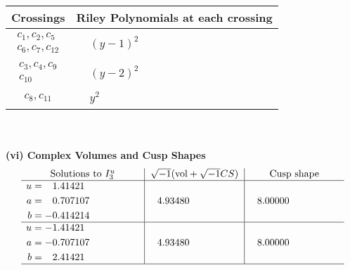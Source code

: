 \documentclass[1p]{elsarticle_modified}
\theoremstyle{definition}
\newcommand{\I}{\sqrt{-1}}
\begin{document}
\begin{tabular}{m{50pt}|m{274pt}}
Crossings & \hspace{64pt}Riley Polynomials at each crossing \\
\hline $$\begin{aligned}c_{1},c_{2},c_{5}\\c_{6},c_{7},c_{12}\end{aligned}$$&$\begin{aligned}
&(y-1)^2
\end{aligned}$\\
\hline $$\begin{aligned}c_{3},c_{4},c_{9}\\c_{10}\end{aligned}$$&$\begin{aligned}
&(y-2)^2
\end{aligned}$\\
\hline $$\begin{aligned}c_{8},c_{11}\end{aligned}$$&$\begin{aligned}
&y^2
\end{aligned}$\\
\hline
\end{tabular}\\~\\
\newpage\flushleft \textbf{(vi) Complex Volumes and Cusp Shapes}
$$\begin{array}{c|c|c}  
\text{Solutions to }I^u_{3}& \I (\text{vol} + \sqrt{-1}CS) & \text{Cusp shape}\\
 \hline 
\begin{aligned}
u &= \phantom{-}1.41421\phantom{ +0.000000I} \\
a &= \phantom{-}0.707107\phantom{ +0.000000I} \\
b &= -0.414214\phantom{ +0.000000I}\end{aligned}
 & \phantom{-}4.93480\phantom{ +0.000000I} & \phantom{-}8.00000\phantom{ +0.000000I} \\ \hline\begin{aligned}
u &= -1.41421\phantom{ +0.000000I} \\
a &= -0.707107\phantom{ +0.000000I} \\
b &= \phantom{-}2.41421\phantom{ +0.000000I}\end{aligned}
 & \phantom{-}4.93480\phantom{ +0.000000I} & \phantom{-}8.00000\phantom{ +0.000000I}\\
 \hline 
 \end{array}$$\newpage\newpage\renewcommand{\arraystretch}{1}
\end{document}

